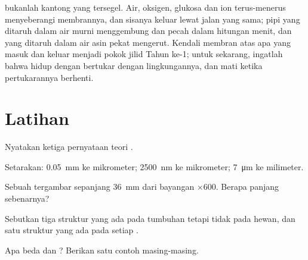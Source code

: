 \begin{remark}\label{rem:g10:cells-common-unit:open}
 bukanlah kantong yang tersegel. Air, oksigen, glukosa dan ion
terus-menerus menyeberangi membrannya, dan sisanya keluar lewat jalan
yang sama;  pipi yang ditaruh dalam air murni menggembung dan pecah
dalam hitungan menit, dan yang ditaruh dalam air asin pekat mengerut.
Kendali membran atas apa yang masuk dan keluar menjadi pokok jilid
Tahun ke-1; untuk sekarang, ingatlah bahwa  hidup dengan bertukar
dengan lingkungannya, dan mati ketika pertukarannya berhenti.
\end{remark}

\section{Latihan}

\begin{exercise}[$\star$]\label{exo:g10:cells-common-unit:1}
Nyatakan ketiga pernyataan teori .
\end{exercise}

\begin{exercise}[$\star$]\label{exo:g10:cells-common-unit:2}
Setarakan: \qty{0.05}{mm} ke mikrometer; \qty{2500}{nm} ke mikrometer;
\qty{7}{\micro m} ke milimeter.
\end{exercise}

\begin{exercise}[$\star$]\label{exo:g10:cells-common-unit:3}
Sebuah  tergambar sepanjang \qty{36}{mm} dari bayangan $\times 600$.
Berapa panjang sebenarnya?
\end{exercise}

\begin{exercise}[$\star$]\label{exo:g10:cells-common-unit:4}
Sebutkan tiga struktur yang ada pada  tumbuhan tetapi tidak pada 
hewan, dan satu struktur yang ada pada setiap .
\end{exercise}

\begin{exercise}[$\star$]\label{exo:g10:cells-common-unit:5}
Apa beda  dan ? Berikan satu contoh
masing-masing.
\end{exercise}

